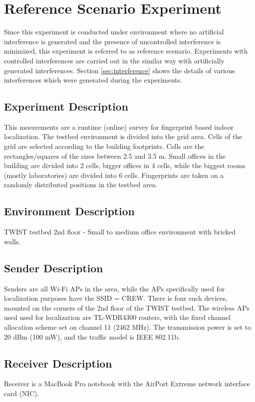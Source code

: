 \documentclass[11pt,a4paper,headinclude,footinclude,chapterprefix=on]{scrreprt}
\begin{document}
\section{Reference Scenario Experiment}
Since this experiment is conducted under environment where no artificial interference is generated and the presence of uncontrolled interference is minimized, this experiment is referred to as reference scenario. Experiments with controlled interferences are carried out in the similar way with artificially generated interferences. Section \ref{sec:interference} shows the details of various interferences which were generated during the experiments.


\subsection{Experiment Description}
This mesurements are a runtime (online) survey for fingerprint based indoor localization. The testbed environment is divided into the grid area. Cells of the grid are selected according to the building footprints. Cells are the rectangles/squares of the sizes between 2.5 and 3.5 m. Small offices in the building are divided into 2 cells, bigger offices in 4 cells, while the biggest rooms (mostly laboratories) are divided into 6 cells. Fingerprints are taken on a randomly distributed positions in the testbed area.

\subsection{Environment Description}
TWIST testbed 2nd floor - Small to medium office environment with bricked walls.

\subsection{Sender Description}
Senders are all Wi-Fi APs in the area, while the APs specifically used for localization purposes have the SSID = CREW. There is four such devices, mounted on the corners of the 2nd floor of the TWIST testbed. The wireless APs used used for localization are TL-WDR4300 routers, with the fixed channel allocation scheme set on channel 11 (2462 MHz). The transmission power is set to 20 dBm (100 mW), and the traffic model is IEEE 802.11b.

\subsection{Receiver Description}
Receiver is a MacBook Pro notebook with the AirPort Extreme network interface card (NIC).
\end{document}
